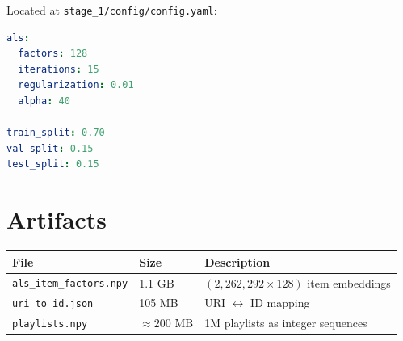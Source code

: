\documentclass[11pt,a4paper]{article}
\begin{document}
Located at \texttt{stage\_1/config/config.yaml}:

\begin{lstlisting}[language=yaml]
als:
  factors: 128
  iterations: 15
  regularization: 0.01
  alpha: 40
  
train_split: 0.70
val_split: 0.15
test_split: 0.15
\end{lstlisting}

\section{Artifacts}

\begin{table}[H]
\centering
\begin{tabular}{llp{5cm}}
\toprule
\textbf{File} & \textbf{Size} & \textbf{Description} \\
\midrule
\texttt{als\_item\_factors.npy} & 1.1 GB & $(2,262,292 \times 128)$ item embeddings \\
\texttt{uri\_to\_id.json} & 105 MB & URI $\leftrightarrow$ ID mapping \\
\texttt{playlists.npy} & $\approx 200$ MB & 1M playlists as integer sequences \\
\bottomrule
\end{tabular}
\end{table}
\end{document}

